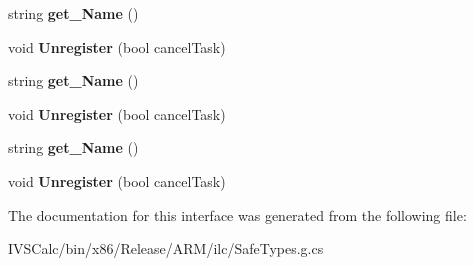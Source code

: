 \begin{DoxyCompactItemize}
string {\bfseries get\+\_\+\+Name} ()
\item 
\mbox{\label{interface_windows_1_1_application_model_1_1_background_1_1_i_background_task_registration_a32f3c4f5fe4a5c399e1eec1ae88de633}} 
void {\bfseries Unregister} (bool cancel\+Task)
\item 
\mbox{\label{interface_windows_1_1_application_model_1_1_background_1_1_i_background_task_registration_ad5142e1ef5565d5584ad51fb7bd89620}} 
string {\bfseries get\+\_\+\+Name} ()
\item 
\mbox{\label{interface_windows_1_1_application_model_1_1_background_1_1_i_background_task_registration_a32f3c4f5fe4a5c399e1eec1ae88de633}} 
void {\bfseries Unregister} (bool cancel\+Task)
\item 
\mbox{\label{interface_windows_1_1_application_model_1_1_background_1_1_i_background_task_registration_ad5142e1ef5565d5584ad51fb7bd89620}} 
string {\bfseries get\+\_\+\+Name} ()
\item 
\mbox{\label{interface_windows_1_1_application_model_1_1_background_1_1_i_background_task_registration_a32f3c4f5fe4a5c399e1eec1ae88de633}} 
void {\bfseries Unregister} (bool cancel\+Task)
\end{DoxyCompactItemize}


The documentation for this interface was generated from the following file\+:\begin{DoxyCompactItemize}
\item 
I\+V\+S\+Calc/bin/x86/\+Release/\+A\+R\+M/ilc/Safe\+Types.\+g.\+cs\end{DoxyCompactItemize}
